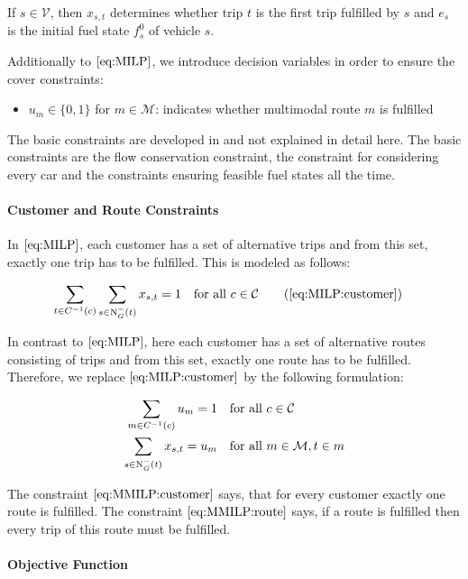 If $s\in\mathcal{V}$, then $x_{s,t}$ determines whether trip $t$ is the first trip fulfilled by $s$ and $e_s$ is the initial fuel state $f^0_s$ of vehicle $s$.

Additionally to $\eqref{eq:MILP}$, we introduce decision variables in order to ensure the cover constraints:

\begin{itemize}
	\item{$u_m\in\{0,1\}$ for $m\in\mathcal{M}$: indicates whether multimodal route $m$ is fulfilled}
\end{itemize}

The basic constraints are developed in \cite[pp. 21-34]{Kaiser_Knoll} and not explained in detail here. The basic constraints are the flow conservation constraint, the constraint for considering every car and the constraints ensuring feasible fuel states all the time.

\paragraph{Customer and Route Constraints} \parfill

In $\eqref{eq:MILP}$, each customer has a set of alternative trips and from this set, exactly one trip has to be fulfilled. This is modeled as follows:

\begin{align*}
	\sum_{t\in C^{-1}(c)} \sum_{s\in\Nin(t)} x_{s,t} = 1 &&& \text{for all } c\in\mathcal{C} \tag{\ref{eq:MILP:customer}}
\end{align*}

In contrast to $\eqref{eq:MILP}$, here each customer has a set of alternative routes consisting of trips and from this set, exactly one route has to be fulfilled. Therefore, we replace $\eqref{eq:MILP:customer}$ by the following formulation:

\begin{align}
	\sum_{m\in C^{-1}(c)} u_m = 1 &&& \text{for all } c\in\mathcal{C} \label{eq:MMILP:customer} \\
	\sum_{s\in\operatorname{N}_G^-(t)} x_{s,t} = u_m &&& \text{for all } m\in\mathcal{M}, t\in m \label{eq:MMILP:route}
\end{align}

The constraint $\eqref{eq:MMILP:customer}$ says, that for every customer exactly one route is fulfilled. The constraint $\eqref{eq:MMILP:route}$ says, if a route is fulfilled then every trip of this route must be fulfilled.

\paragraph{Objective Function} \parfill

